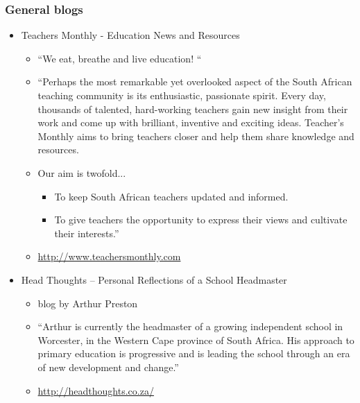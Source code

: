 \subsubsection{General blogs}
\begin{itemize}
\item Teachers Monthly - Education News and Resources
    \begin{itemize}[noitemsep]
      \item “We eat, breathe and live education! “
      \item “Perhaps the most remarkable yet overlooked aspect of the South African teaching community is its enthusiastic, passionate spirit. Every day, thousands of talented, hard-working teachers gain new insight from their work and come up with brilliant, inventive and exciting ideas. Teacher’s Monthly aims to bring teachers closer and help them share knowledge and resources.
      \item Our aim is twofold...
	    \begin{itemize}[noitemsep]
	      \item To keep South African teachers updated and informed.
	    \item To give teachers the opportunity to express their views and cultivate their interests.”
	    \end{itemize}
      \item \underline{http://www.teachersmonthly.com }
    \end{itemize}

\item Head Thoughts – Personal Reflections of a School Headmaster
    \begin{itemize}[noitemsep]
	\item blog by Arthur Preston
	\item “Arthur is currently the headmaster of a growing independent school in Worcester, in the Western Cape province of South Africa. His approach to primary education is progressive and is leading the school through an era of new development and change.”
\item \underline{http://headthoughts.co.za/ }
    \end{itemize}
\end{itemize}

